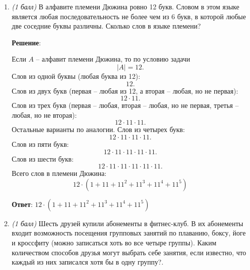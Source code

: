 \documentclass{article}
\begin{document}
    \begin{enumerate}
        \item \textit{(1 балл)} В алфавите племени Дюжина ровно 12 букв. Словом в этом языке является любая последовательность не более чем из 6 букв, в которой любые две соседние буквы различны. Сколько слов в языке племени?
        
        \textbf{Решение}:

        Если $A$ -- алфавит племени Дюжина, то по условию задачи
        \begin{equation}
            |A| = 12.            
        \end{equation}
        Слов из одной буквы (любая буква из 12):
        \begin{equation}
            12.
        \end{equation}
        Слов из двух букв (первая -- любая из 12, а вторая -- любая, но не первая):
        \begin{equation}
            12\cdot 11.
        \end{equation}
        Слов из трех букв (первая -- любая, вторая -- любая, но не первая, третья -- любая, но не вторая):
        \begin{equation}
            12\cdot 11\cdot 11.
        \end{equation}
        Остальные варианты по аналогии. Слов из четырех букв:
        \begin{equation}
            12\cdot 11\cdot 11\cdot 11.
        \end{equation}
        Слов из пяти букв:
        \begin{equation}
            12\cdot 11\cdot 11\cdot 11\cdot 11.
        \end{equation}
        Слов из шести букв:
        \begin{equation}
            12\cdot 11\cdot 11\cdot 11\cdot 11\cdot 11.
        \end{equation}
        Всего слов в племени Дюжина:
        \begin{equation}
            12 \cdot (1 + 11 + 11^2 + 11^3 + 11^4 + 11^5)
        \end{equation}

        \textbf{Ответ}:
        $12 \cdot (1 + 11 + 11^2 + 11^3 + 11^4 + 11^5)$


        \item \textit{(1 балл)} Шесть друзей купили абонементы в фитнес-клуб. В их абонементы входит возможность посещения групповых занятий по плаванию, боксу, йоге и кроссфиту (можно записаться хоть во все четыре группы). Каким количеством способов друзья могут выбрать себе занятия, если известно, что каждый из них записался хотя бы в одну группу?.
        

\end{enumerate}
\end{document}
